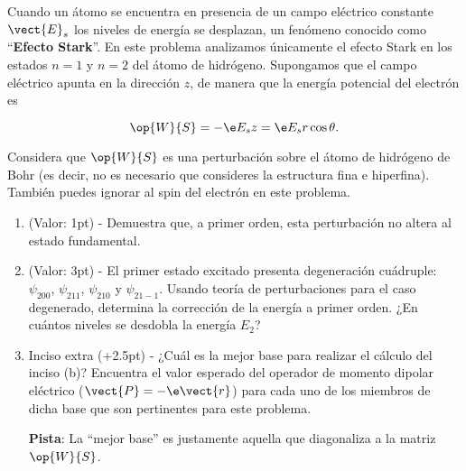 \documentclass[./../main.tex]{subfiles}
\begin{document}
    \begin{exercise}
        Cuando un átomo se encuentra en presencia de un campo eléctrico constante \(\vect{E}_{s}\) los niveles de energía se desplazan, un fenómeno conocido como ``\textbf{Efecto Stark}''. En este problema analizamos únicamente el efecto Stark en los estados \(n = 1\) y \(n = 2\) del átomo de hidrógeno. Supongamos que el campo eléctrico apunta en la dirección \(z\), de manera que la energía potencial del electrón es

        \begin{equation*}
            \op{W}{S} = -\e E_{s}z = \e E_{s}r\cos\theta.
        \end{equation*}

        Considera que \(\op{W}{S}\) es una perturbación sobre el átomo de hidrógeno de Bohr (es decir, no es necesario que consideres la estructura fina e hiperfina). También puedes ignorar al spin del electrón en este problema.

        \begin{enumerate}
            \item (Valor: 1pt) - Demuestra que, a primer orden, esta perturbación no altera al estado fundamental.
            \item (Valor: 3pt) - El primer estado excitado presenta degeneración cuádruple: \(\psi_{200}\), \(\psi_{211}\), \(\psi_{210}\) y \(\psi_{21-1}\). Usando teoría de perturbaciones para el caso degenerado, determina la corrección de la energía a primer orden. ¿En cuántos niveles se desdobla la energía \(E_{2}\)?
            
            \color{blue}
            \item Inciso extra (+2.5pt) - ¿Cuál es la mejor base para realizar el cálculo del inciso (b)? Encuentra el valor esperado del operador de momento dipolar eléctrico (\(\vect{P} = -\e\vect{r}\)) para cada uno de los miembros de dicha base que son pertinentes para este problema.
            
            \textbf{Pista}: La ``mejor base'' es justamente aquella que diagonaliza a la matriz \(\op{W}{S}\).
        \end{enumerate}
    \end{exercise}
\end{document}
